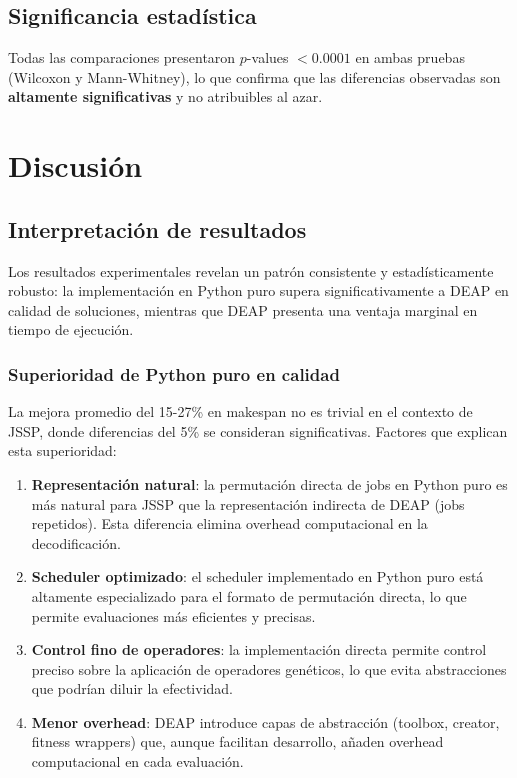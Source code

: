 \documentclass[12pt,a4paper]{article}
\begin{document}
\subsection{Significancia estadística}

Todas las comparaciones presentaron $p$-values $< 0.0001$ en ambas pruebas (Wilcoxon y Mann-Whitney), lo que confirma que las diferencias observadas son \textbf{altamente significativas} y no atribuibles al azar.

\section{Discusión}

\subsection{Interpretación de resultados}

Los resultados experimentales revelan un patrón consistente y estadísticamente robusto: la implementación en Python puro supera significativamente a DEAP en calidad de soluciones, mientras que DEAP presenta una ventaja marginal en tiempo de ejecución.

\subsubsection{Superioridad de Python puro en calidad}

La mejora promedio del 15-27\% en makespan no es trivial en el contexto de JSSP, donde diferencias del 5\% se consideran significativas. Factores que explican esta superioridad:

\begin{enumerate}
    \item \textbf{Representación natural}: la permutación directa de jobs en Python puro es más natural para JSSP que la representación indirecta de DEAP (jobs repetidos). Esta diferencia elimina overhead computacional en la decodificación.
    
    \item \textbf{Scheduler optimizado}: el scheduler implementado en Python puro está altamente especializado para el formato de permutación directa, lo que permite evaluaciones más eficientes y precisas.
    
    \item \textbf{Control fino de operadores}: la implementación directa permite control preciso sobre la aplicación de operadores genéticos, lo que evita abstracciones que podrían diluir la efectividad.
    
    \item \textbf{Menor overhead}: DEAP introduce capas de abstracción (toolbox, creator, fitness wrappers) que, aunque facilitan desarrollo, añaden overhead computacional en cada evaluación.
\end{enumerate}
\end{document}

